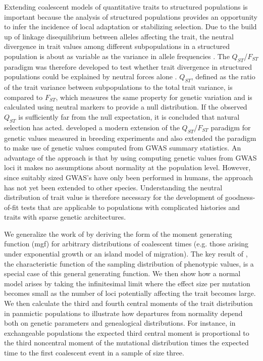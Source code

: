 Extending coalescent models of quantitative traits to structured populations is
important because the analysis of structured populations provides an opportunity
to infer the incidence of local adaptation or stabilizing selection. Due to the
build up of linkage disequilibrium between alleles affecting the trait, the
neutral divergence in trait values among different subpopulations in a
structured population is about as variable as the variance in allele
frequencies \citep{Rogers1983}. The $Q_{ST}$/$F_{ST}$ paradigm was therefore
developed to test whether trait divergence in structured populations could be
explained by neutral forces alone \citep{Spitze1993,Whitlock2008,Leinonen2013}.
$Q_{ST}$, defined as the ratio of the trait variance between subpopulations to
the total trait variance, is compared to $F_{ST}$, which measures the same
property for genetic variation and is calculated using neutral markers to
provide a null distribution. If the observed $Q_{ST}$ is sufficiently far from
the null expectation, it is concluded that natural selection has
acted. \citet{Ovaskainen2011} developed a modern extension of the
$Q_{ST}$/$F_{ST}$ paradigm for genetic values measured in breeding experiments
and \citet{Berg2014} also extended the paradigm to make use of genetic values
computed from GWAS summary statistics. An advantage of the
\citet{Berg2014} approach is that by using computing genetic values from GWAS
loci it makes no assumptions about normality at the population level. However,
since suitably sized GWAS's have only been performed in humans, the approach has
not yet been extended to other species. Understanding the neutral distribution
of trait value is therefore necessary for the development of goodness-of-fit
tests that are applicable to populations with complicated histories and traits
with sparse genetic architectures.

We generalize the work of \citet{Schraiber2015} by deriving the form of the
moment generating function (mgf) for arbitrary distributions of coalescent times
(e.g. those arising under exponential growth or an island model of migration).
The key result of \citet{Schraiber2015}, the characteristic function of the
sampling distribution of phenotypic values, is a special case of this general
generating function. We then show how a normal model arises by taking the
infinitesimal limit where the effect size per mutation becomes small as the
number of loci potentially affecting the trait becomes large. We then calculate
the third and fourth central moments of the trait distribution in panmictic
populations to illustrate how departures from normality depend both on genetic
parameters and genealogical distributions. For instance, in exchangeable
populations the expected third central moment is proportional to the third
noncentral moment of the mutational distribution times the expected time to the
first coalescent event in a sample of size three.

